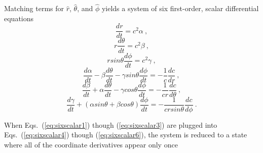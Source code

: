 \documentclass{ws-jca}
\begin{document}
Matching terms for \(\hat{r}\), \(\hat{\theta}\), and \(\hat{\phi}\) yields
a system of six first-order, scalar differential equations
\begin{equation}
\frac{dr}{dt} = c^2 \alpha \:,
\label{eq:sixscalar1}
\end{equation}
\begin{equation}
	r \frac{d\theta}{dt} = c^2 \beta \:,
	\label{eq:sixscalar2}
\end{equation}
\begin{equation}
	r sin\theta \frac{d\phi}{dt} = c^2\gamma \:,
	\label{eq:sixscalar3}
\end{equation}
\begin{equation}
	\frac{d\alpha}{dt} - \beta \frac{d\theta}{dt} 
		- \gamma sin\theta \frac{d\phi}{dt} 
		= -\frac{1}{c}\frac{dc}{dr} \:,
	\label{eq:sixscalar4}
\end{equation}
\begin{equation}
	\frac{d\beta}{dt} + \alpha \frac{d\theta}{dt} 
		- \gamma cos\theta \frac{d\phi}{dt} 
		= -\frac{1}{cr}\frac{dc}{d\theta} \:,
	\label{eq:sixscalar5}
\end{equation}
\begin{equation}
	\frac{d\gamma}{dt} + \left( \alpha sin\theta 
		+ \beta cos\theta \right) \frac{d\phi}{dt} 
		= -\frac{1}{cr sin\theta}\frac{dc}{d\phi} \:.
	\label{eq:sixscalar6}
\end{equation}

When Eqs.~(\ref{eq:sixscalar1}) though (\ref{eq:sixscalar3}) are plugged
into Eqs.~(\ref{eq:sixscalar4}) though (\ref{eq:sixscalar6}), the system is
reduced to a state where all of the coordinate derivatives appear only once
\end{document}

